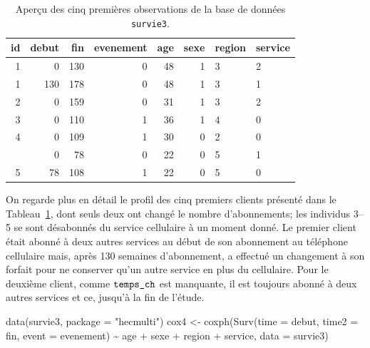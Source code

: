 \documentclass[
  11pt,
  letterpaper,
]{scrbook}
\newenvironment{Shaded}{\begin{snugshade}}{\end{snugshade}}
\newcommand{\AttributeTok}[1]{\textcolor[rgb]{0.40,0.45,0.13}{#1}}
\newcommand{\FunctionTok}[1]{\textcolor[rgb]{0.28,0.35,0.67}{#1}}
\newcommand{\NormalTok}[1]{\textcolor[rgb]{0.00,0.23,0.31}{#1}}
\newcommand{\OtherTok}[1]{\textcolor[rgb]{0.00,0.23,0.31}{#1}}
\newcommand{\SpecialCharTok}[1]{\textcolor[rgb]{0.37,0.37,0.37}{#1}}
\newcommand{\StringTok}[1]{\textcolor[rgb]{0.13,0.47,0.30}{#1}}
\theoremstyle{definition}
\theoremstyle{remark}
\begin{document}
\begin{longtable}[t]{rrrrrrll}

\caption{\label{tbl-survie3-donnees}Aperçu des cinq premières
observations de la base de données \texttt{survie3}.}

\tabularnewline

\toprule
id & debut & fin & evenement & age & sexe & region & service\\
\midrule
1 & 0 & 130 & 0 & 48 & 1 & 3 & 2\\
1 & 130 & 178 & 0 & 48 & 1 & 3 & 1\\
2 & 0 & 159 & 0 & 31 & 1 & 3 & 2\\
3 & 0 & 110 & 1 & 36 & 1 & 4 & 0\\
4 & 0 & 109 & 1 & 30 & 0 & 2 & 0\\
\addlinespace
5 & 0 & 78 & 0 & 22 & 0 & 5 & 1\\
5 & 78 & 108 & 1 & 22 & 0 & 5 & 0\\
\bottomrule

\end{longtable}

On regarde plus en détail le profil des cinq premiers clients présenté
dans le Tableau~\ref{tbl-survie3-donnees}, dont seuls deux ont changé le
nombre d'abonnements; les individus 3--5 se sont désabonnés du service
cellulaire à un moment donné. Le premier client était abonné à deux
autres services au début de son abonnement au téléphone cellulaire mais,
après 130 semaines d'abonnement, a effectué un changement à son forfait
pour ne conserver qu'un autre service en plus du cellulaire. Pour le
deuxième client, comme \(\verb+temps_ch+\) est manquante, il est
toujours abonné à deux autres services et ce, jusqu'à la fin de l'étude.

\begin{Shaded}
\begin{Highlighting}[]
\FunctionTok{data}\NormalTok{(survie3, }\AttributeTok{package =} \StringTok{"hecmulti"}\NormalTok{)}
\NormalTok{cox4 }\OtherTok{\textless{}{-}} \FunctionTok{coxph}\NormalTok{(}\FunctionTok{Surv}\NormalTok{(}\AttributeTok{time =}\NormalTok{ debut, }
                   \AttributeTok{time2 =}\NormalTok{ fin, }
                   \AttributeTok{event =}\NormalTok{ evenement) }\SpecialCharTok{\textasciitilde{}} 
\NormalTok{                age }\SpecialCharTok{+}\NormalTok{ sexe }\SpecialCharTok{+}\NormalTok{ region }\SpecialCharTok{+}\NormalTok{ service, }
              \AttributeTok{data =}\NormalTok{ survie3)}
\end{Highlighting}
\end{Shaded}
\end{document}
